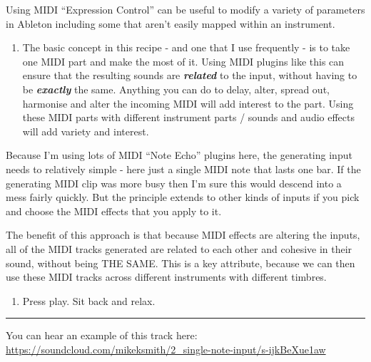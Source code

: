 \documentclass[
  12pt,
  letterpaper,
  oneside,
  open=any]{scrbook}
\providecommand{\tightlist}{%
  \setlength{\itemsep}{0pt}\setlength{\parskip}{0pt}}\usepackage{longtable,booktabs,array}
\begin{document}
Using MIDI ``Expression Control'' can be useful to modify a variety of
parameters in Ableton including some that aren't easily mapped within an
instrument.

\begin{enumerate}
\def\labelenumi{\arabic{enumi}.}
\setcounter{enumi}{8}
\tightlist
\item
  The basic concept in this recipe - and one that I use frequently - is
  to take one MIDI part and make the most of it. Using MIDI plugins like
  this can ensure that the resulting sounds are \textbf{\emph{related}}
  to the input, without having to be \textbf{\emph{exactly}} the same.
  Anything you can do to delay, alter, spread out, harmonise and alter
  the incoming MIDI will add interest to the part. Using these MIDI
  parts with different instrument parts / sounds and audio effects will
  add variety and interest.
\end{enumerate}

Because I'm using lots of MIDI ``Note Echo'' plugins here, the
generating input needs to relatively simple - here just a single MIDI
note that lasts one bar. If the generating MIDI clip was more busy then
I'm sure this would descend into a mess fairly quickly. But the
principle extends to other kinds of inputs if you pick and choose the
MIDI effects that you apply to it.

The benefit of this approach is that because MIDI effects are altering
the inputs, all of the MIDI tracks generated are related to each other
and cohesive in their sound, without being THE SAME. This is a key
attribute, because we can then use these MIDI tracks across different
instruments with different timbres.

\begin{enumerate}
\def\labelenumi{\arabic{enumi}.}
\setcounter{enumi}{9}
\tightlist
\item
  Press play. Sit back and relax.
\end{enumerate}

\begin{center}\rule{0.5\linewidth}{0.5pt}\end{center}

You can hear an example of this track here:
\href{https://soundcloud.com/mikeksmith/2_single-note-input/s-ijkBeXue1aw?in=mikeksmith/sets/the-lazy-producer-recipes/s-PGMEWqfwKGz&si=4cb32f77057549d28894966ca45a2715&utm_source=clipboard&utm_medium=text&utm_campaign=social_sharing}{https://soundcloud.com/mikeksmith/2\_single-note-input/s-ijkBeXue1aw}
\end{document}
